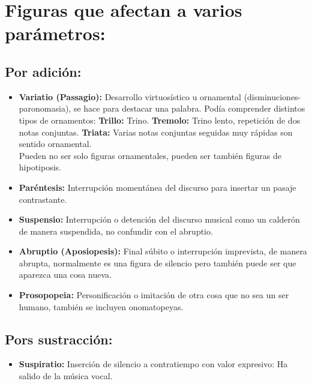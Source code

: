 \documentclass[11pt,a4paper]{article}
\begin{document}
		\section{Figuras que afectan a varios parámetros:}
			\subsection{Por adición:} 
				\begin{itemize}
					\item \textbf{Variatio (Passagio):} Desarrollo virtuosístico u ornamental (disminuciones-paronomasia), se hace para destacar una palabra. Podía comprender distintos tipos de ornamentos:
					\subitem \textbf{Trillo:} Trino.
					\subitem \textbf{Tremolo:} Trino lento, repetición de dos notas conjuntas.
					\subitem \textbf{Triata:} Varias notas conjuntas seguidas muy rápidas son sentido ornamental.\\ Pueden no ser solo figuras ornamentales, pueden ser también figuras de hipotiposis.
					\item \textbf{Paréntesis:} Interrupción momentánea del discurso para insertar un pasaje contrastante.
					\item \textbf{Suspensio:} Interrupción o detención del discurso musical como un calderón de manera suspendida, no confundir con el abruptio.
					\item \textbf{Abruptio (Aposiopesis):} Final súbito o interrupción imprevista, de manera abrupta, normalmente es una figura de silencio pero también puede ser que aparezca una cosa nueva.
					\item \textbf{Prosopopeia:} Personificación o imitación de otra cosa que no sea un ser humano, también se incluyen onomatopeyas.					
				\end{itemize}
			\subsection{Pors sustracción:}
				\begin{itemize}
					\item \textbf{Suspiratio:} Inserción de silencio a contratiempo con valor expresivo: Ha salido de la música vocal.
				\end{itemize}
\end{document}
